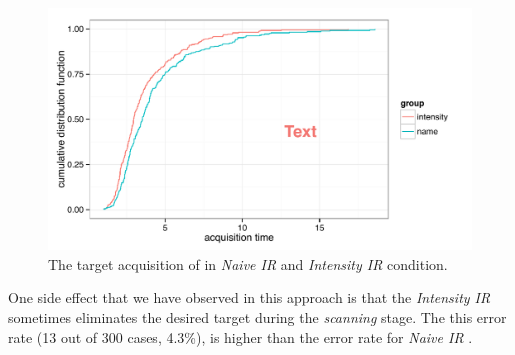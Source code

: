 

\begin{figure}[t]
\centering
\includegraphics[width=0.9\columnwidth]{figures/study2_time.pdf}
\caption{The target acquisition of in {\em Naive IR} and {\em Intensity IR} condition.}
\label{fig:study2}
\end{figure}

One side effect that we have observed in this approach is that the {\em Intensity IR} sometimes eliminates the desired target during the {\em scanning} stage. The this error rate (13 out of 300 cases, 4.3\%), is higher than the error rate for {\em Naive IR} . %

